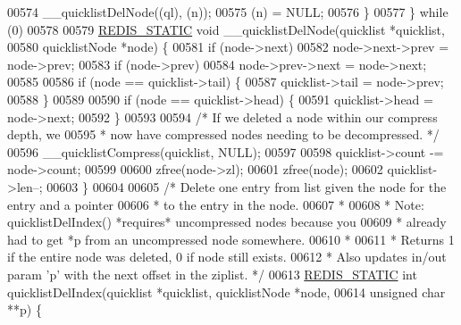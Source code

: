 \begin{DoxyCode}
{00574             \textcolor{preprocessor}{\_\_quicklistDelNode}\textcolor{preprocessor}{(}\textcolor{preprocessor}{(}\textcolor{preprocessor}{ql}\textcolor{preprocessor}{)}\textcolor{preprocessor}{,} \textcolor{preprocessor}{(}\textcolor{preprocessor}{n}\textcolor{preprocessor}{)}\textcolor{preprocessor}{)}\textcolor{preprocessor}{;}
00575             \textcolor{preprocessor}{(}\textcolor{preprocessor}{n}\textcolor{preprocessor}{)} \textcolor{preprocessor}{=} \textcolor{preprocessor}{NULL}\textcolor{preprocessor}{;}
00576         \textcolor{preprocessor}{\}}
00577     \textcolor{preprocessor}{\}} \textcolor{keywordflow}{while} \textcolor{preprocessor}{(}0\textcolor{preprocessor}{)}
00578 
00579 \hyperlink{quicklist_8c_a9c22c9c899458021930a552a4f94d317}{REDIS\_STATIC} \textcolor{keywordtype}{void} \_\_quicklistDelNode(quicklist *quicklist,
00580                                      quicklistNode *node) \{
00581     \textcolor{keywordflow}{if} (node->next)
00582         node->next->prev = node->prev;
00583     \textcolor{keywordflow}{if} (node->prev)
00584         node->prev->next = node->next;
00585 
00586     \textcolor{keywordflow}{if} (node == quicklist->tail) \{
00587         quicklist->tail = node->prev;
00588     \}
00589 
00590     \textcolor{keywordflow}{if} (node == quicklist->head) \{
00591         quicklist->head = node->next;
00592     \}
00593 
00594     \textcolor{comment}{/* If we deleted a node within our compress depth, we}
00595 \textcolor{comment}{     * now have compressed nodes needing to be decompressed. */}
00596     \_\_quicklistCompress(quicklist, NULL);
00597 
00598     quicklist->count -= node->count;
00599 
00600     zfree(node->zl);
00601     zfree(node);
00602     quicklist->len--;
00603 \}
00604 
00605 \textcolor{comment}{/* Delete one entry from list given the node for the entry and a pointer}
00606 \textcolor{comment}{ * to the entry in the node.}
00607 \textcolor{comment}{ *}
00608 \textcolor{comment}{ * Note: quicklistDelIndex() *requires* uncompressed nodes because you}
00609 \textcolor{comment}{ *       already had to get *p from an uncompressed node somewhere.}
00610 \textcolor{comment}{ *}
00611 \textcolor{comment}{ * Returns 1 if the entire node was deleted, 0 if node still exists.}
00612 \textcolor{comment}{ * Also updates in/out param 'p' with the next offset in the ziplist. */}
00613 \hyperlink{quicklist_8c_a9c22c9c899458021930a552a4f94d317}{REDIS\_STATIC} \textcolor{keywordtype}{int} quicklistDelIndex(quicklist *quicklist, quicklistNode *node,
00614                                    \textcolor{keywordtype}{unsigned} \textcolor{keywordtype}{char} **p) \{
}
\end{DoxyCode}
